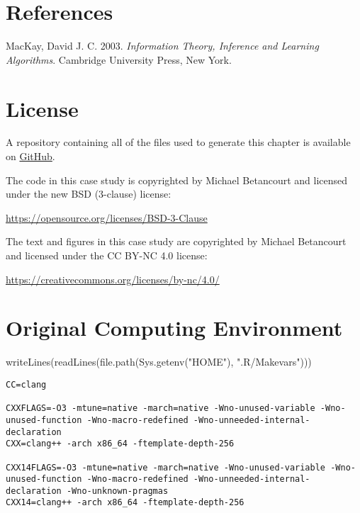 \documentclass[
  letterpaper,
  DIV=11,
  numbers=noendperiod]{scrartcl}
\newenvironment{Shaded}{\begin{snugshade}}{\end{snugshade}}
\newcommand{\FunctionTok}[1]{\textcolor[rgb]{0.28,0.35,0.67}{#1}}
\newcommand{\NormalTok}[1]{\textcolor[rgb]{0.00,0.23,0.31}{#1}}
\newcommand{\StringTok}[1]{\textcolor[rgb]{0.13,0.47,0.30}{#1}}
\newlength{\cslhangindent}
\newenvironment{CSLReferences}[2] %
 {\begin{list}{}{%
  \setlength{\itemindent}{0pt}
  \setlength{\leftmargin}{0pt}
  \setlength{\parsep}{0pt}
  \ifodd #1
   \setlength{\leftmargin}{\cslhangindent}
   \setlength{\itemindent}{-1\cslhangindent}
  \fi
  \setlength{\itemsep}{#2\baselineskip}}}
 {\end{list}}
\begin{document}
\section*{References}\label{references}

\label{refs}
\begin{CSLReferences}{1}{0}
MacKay, David J. C. 2003. \emph{Information Theory, Inference and
Learning Algorithms}. Cambridge University Press, New York.

\end{CSLReferences}

\section*{License}\label{license}

A repository containing all of the files used to generate this chapter
is available on
\href{https://github.com/betanalpha/quarto_chapters/tree/main/case_studies/window_inference}{GitHub}.

The code in this case study is copyrighted by Michael Betancourt and
licensed under the new BSD (3-clause) license:

\url{https://opensource.org/licenses/BSD-3-Clause}

The text and figures in this case study are copyrighted by Michael
Betancourt and licensed under the CC BY-NC 4.0 license:

\url{https://creativecommons.org/licenses/by-nc/4.0/}

\section*{Original Computing
Environment}\label{original-computing-environment}

\begin{Shaded}
\begin{Highlighting}[]
\FunctionTok{writeLines}\NormalTok{(}\FunctionTok{readLines}\NormalTok{(}\FunctionTok{file.path}\NormalTok{(}\FunctionTok{Sys.getenv}\NormalTok{(}\StringTok{"HOME"}\NormalTok{), }\StringTok{".R/Makevars"}\NormalTok{)))}
\end{Highlighting}
\end{Shaded}

\begin{verbatim}
CC=clang

CXXFLAGS=-O3 -mtune=native -march=native -Wno-unused-variable -Wno-unused-function -Wno-macro-redefined -Wno-unneeded-internal-declaration
CXX=clang++ -arch x86_64 -ftemplate-depth-256

CXX14FLAGS=-O3 -mtune=native -march=native -Wno-unused-variable -Wno-unused-function -Wno-macro-redefined -Wno-unneeded-internal-declaration -Wno-unknown-pragmas
CXX14=clang++ -arch x86_64 -ftemplate-depth-256
\end{verbatim}
\end{document}
